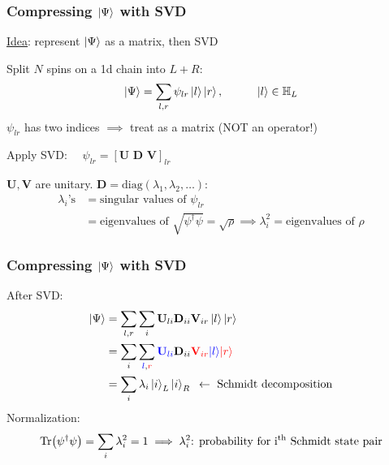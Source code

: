\documentclass{beamer}
\theoremstyle{definition}
\begin{document}
\begin{frame}
	\frametitle{Compressing $\ket{\Psi}$ with SVD}
	\underline{Idea}: represent $\ket{\Psi}$ as a matrix, then SVD\\
	
	\vspace{8pt}
	
	Split $N$ spins on a 1d chain into $L+R$: 
	\begin{align*}
		\ket{\Psi} = \sum_{l,r} \psi_{lr} \ket{l}\ket{r}, \quad\quad\quad \ket{l}\in \mathbb{H}_L
	\end{align*}
	$\psi_{lr}$ has two indices $\implies$ treat as a matrix (NOT an operator!) \\ 
	
	\vspace{8pt} 
	
	Apply SVD: $\quad\psi_{lr} = [\mathbf{U}\,\,\mathbf{D}\,\,\mathbf{V}]_{lr}$\\
	
	\vspace{8pt}
	
	$\mathbf{U}, \mathbf{V}$ are unitary. $\mathbf{D} = \text{diag}(\lambda_1,\lambda_2,\dots)$:
	\begin{align*}
		\lambda_i\text{'s} 
		&= \text{singular values of } \psi_{lr} \\
		&= \text{eigenvalues of } \sqrt{\psi^\dagger\psi} = \sqrt{\rho} \implies \lambda_i^2 = \text{eigenvalues of } \rho
	\end{align*}
	
\end{frame}


\begin{frame}
	\frametitle{Compressing $\ket{\Psi}$ with SVD}
	
	After SVD:
	\begin{align*}
		\ket{\Psi} &= \sum_{l,r} \sum_{i} \mathbf{U}_{li}\mathbf{D}_{ii} \mathbf{V}_{ir} \ket{l}\ket{r}\\
		&= \sum_{i} \sum_{\textcolor{blue}{l},\textcolor{red}{r}}  \textcolor{blue}{\mathbf{U}_{li}}\mathbf{D}_{ii} \textcolor{red}{\mathbf{V}_{ir} } \textcolor{blue}{\ket{l}}\textcolor{red}{\ket{r}}\\
		&= \sum_i \lambda_i \ket{i}_L \ket{i}_R \,\,\,\leftarrow \text{ Schmidt decomposition}
	\end{align*}
	Normalization:
	\begin{align*}
		\Tr(\psi^\dagger\psi) = \sum_i \lambda_i^2 = 1 \implies \lambda_i^2 \text{: probability for i$^\text{th}$ Schmidt state pair}
	\end{align*}
\end{frame}
\end{document}

